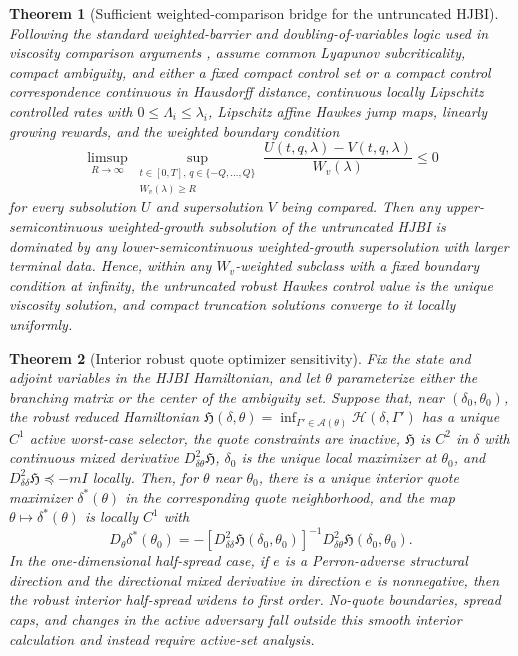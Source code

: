 \documentclass[11pt]{article}
\newtheorem{theorem}{Theorem}
\begin{document}
\begin{theorem}[Sufficient weighted-comparison bridge for the untruncated HJBI]
Following the standard weighted-barrier and doubling-of-variables logic used in
viscosity comparison arguments
\cite{CrandallIshiiLions1992,FlemingSoner2006}, assume common Lyapunov
subcriticality, compact ambiguity, and either a fixed
compact control set or a compact control correspondence continuous in Hausdorff
distance, continuous locally Lipschitz controlled rates with
$0\le\Lambda_i\le\lambda_i$, Lipschitz affine Hawkes jump maps, linearly
growing rewards, and the weighted boundary condition
\[
\limsup_{R\to\infty}
\sup_{\substack{t\in[0,T],\,q\in\{-Q,\ldots,Q\}\\ W_v(\lambda)\ge R}}
\frac{U(t,q,\lambda)-V(t,q,\lambda)}{W_v(\lambda)}\le 0
\]
for every subsolution $U$ and supersolution $V$ being compared. Then any
upper-semicontinuous weighted-growth subsolution of the untruncated HJBI is
dominated by any lower-semicontinuous weighted-growth supersolution with larger
terminal data. Hence, within any $W_v$-weighted subclass with a fixed boundary
condition at infinity, the untruncated robust Hawkes control value is the
unique viscosity solution, and compact truncation solutions converge to it
locally uniformly.
\end{theorem}

\begin{theorem}[Interior robust quote optimizer sensitivity]
Fix the state and adjoint variables in the HJBI Hamiltonian, and let $\theta$
parameterize either the branching matrix or the center of the ambiguity set.
Suppose that, near $(\delta_0,\theta_0)$, the robust reduced Hamiltonian
$\mathfrak H(\delta,\theta)=\inf_{\Gamma'\in\mathcal A(\theta)}
\mathcal H(\delta,\Gamma')$ has a unique $C^1$ active worst-case selector, the
quote constraints are inactive, $\mathfrak H$ is $C^2$ in $\delta$ with
continuous mixed derivative $D^2_{\delta\theta}\mathfrak H$, $\delta_0$ is the
unique local maximizer at $\theta_0$, and
$D^2_{\delta\delta}\mathfrak H\preceq -mI$ locally. Then, for $\theta$ near
$\theta_0$, there is a unique interior quote maximizer $\delta^*(\theta)$ in
the corresponding quote neighborhood, and the map $\theta\mapsto\delta^*(\theta)$
is locally $C^1$ with
\[
D_\theta\delta^*(\theta_0)=
-\left[D^2_{\delta\delta}\mathfrak H(\delta_0,\theta_0)\right]^{-1}
D^2_{\delta\theta}\mathfrak H(\delta_0,\theta_0).
\]
In the one-dimensional half-spread case, if $e$ is a Perron-adverse structural
direction and the directional mixed derivative in direction $e$ is nonnegative,
then the robust interior half-spread widens to first order. No-quote
boundaries, spread caps, and changes in the active adversary fall outside this
smooth interior calculation and instead require active-set analysis.
\end{theorem}
\end{document}
